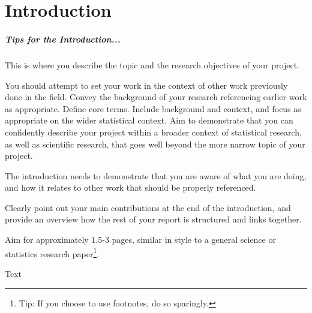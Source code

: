 \chapter{Introduction}

\paragraph{Tips for the Introduction...} This is where you describe the topic and the research
objectives of your project. 

You should attempt to set your work in the context of other work previously done in the field.
Convey the background of your research referencing earlier work as appropriate. Define core terms.
Include background and context, and focus as appropriate on the wider statistical context. Aim to
demonstrate that you can confidently describe your project within a broader context of statistical
research, as well as scientific research, that goes well beyond the more narrow topic of your
project.

The introduction needs to demonstrate that you are aware of what you are doing, and how it relates
to other work that should be properly referenced. 

Clearly point out your main contributions at the end of the introduction, and provide an overview
how the rest of your report is structured and links together. 

Aim for approximately 1.5-3 pages, similar in style to a general science or statistics research
paper\footnote{Tip: If you choose to use footnotes, do so sparingly.}.

\newpage

Text
